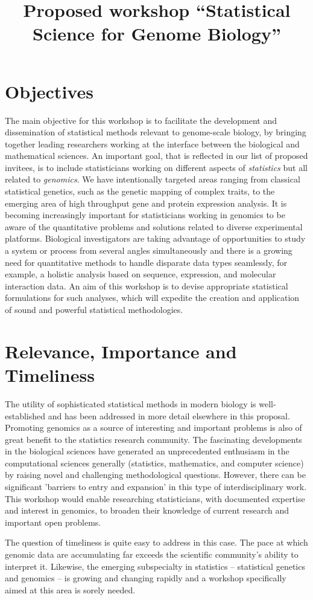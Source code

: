 \documentclass{amsart}
\begin{document}
\title{Proposed workshop ``Statistical Science for Genome Biology''}

\maketitle
\section*{Objectives}

The main objective for this workshop is to facilitate the development
and dissemination of statistical methods relevant to genome-scale
biology, by bringing together leading researchers working at the
interface between the biological and mathematical sciences.  An
important goal, that is reflected in our list of proposed invitees, is
to include statisticians working on different aspects of
\emph{statistics} but all related to \emph{genomics}.  We have
intentionally targeted areas ranging from classical statistical
genetics, such as the genetic mapping of complex traits, to the
emerging area of high throughput gene and protein expression analysis.
It is becoming increasingly important for statisticians working in
genomics to be aware of the quantitative problems and solutions
related to diverse experimental platforms.  Biological investigators
are taking advantage of opportunities to study a system or process
from several angles simultaneously and there is a growing need for
quantitative methods to handle disparate data types seamlessly, for
example, a holistic analysis based on sequence, expression, and
molecular interaction data.  An aim of this workshop is to devise
appropriate statistical formulations for such analyses, which will
expedite the creation and application of sound and powerful
statistical methodologies.

\section*{Relevance, Importance and Timeliness} The utility of
sophisticated statistical methods in modern biology is
well-established and has been addressed in more detail elsewhere in
this proposal.  Promoting genomics as a source of interesting and
important problems is also of great benefit to the statistics research
community.  The fascinating developments in the biological sciences
have generated an unprecedented enthusiasm in the computational
sciences generally (statistics, mathematics, and computer science) by
raising novel and challenging methodological questions.  However,
there can be significant 'barriers to entry and expansion' in this
type of interdisciplinary work. This workshop would enable researching
statisticians, with documented expertise and interest in genomics, to
broaden their knowledge of current research and important open
problems.

The question of timeliness is quite easy to address in this case.  The
pace at which genomic data are accumulating far exceeds the scientific
community's ability to interpret it.  Likewise, the emerging
subspecialty in statistics -- statistical genetics and genomics -- is
growing and changing rapidly and a workshop specifically aimed at this
area is sorely needed.
\end{document}
